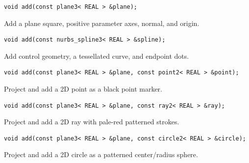 \par\noindent\begin{minipage}{\linewidth}
\begin{lstlisting}[style=apireference]
void add(const plane3< REAL > &plane);
\end{lstlisting}
{\footnotesize Add a plane square, positive parameter axes, normal, and origin.\par}
\end{minipage}\par\vspace{1pt}
\par\noindent\begin{minipage}{\linewidth}
\begin{lstlisting}[style=apireference]
void add(const nurbs_spline3< REAL > &spline);
\end{lstlisting}
{\footnotesize Add control geometry, a tessellated curve, and endpoint dots.\par}
\end{minipage}\par\vspace{1pt}
\par\noindent\begin{minipage}{\linewidth}
\begin{lstlisting}[style=apireference]
void add(const plane3< REAL > &plane, const point2< REAL > &point);
\end{lstlisting}
{\footnotesize Project and add a 2D point as a black point marker.\par}
\end{minipage}\par\vspace{1pt}
\par\noindent\begin{minipage}{\linewidth}
\begin{lstlisting}[style=apireference]
void add(const plane3< REAL > &plane, const ray2< REAL > &ray);
\end{lstlisting}
{\footnotesize Project and add a 2D ray with pale-red patterned strokes.\par}
\end{minipage}\par\vspace{1pt}
\par\noindent\begin{minipage}{\linewidth}
\begin{lstlisting}[style=apireference]
void add(const plane3< REAL > &plane, const circle2< REAL > &circle);
\end{lstlisting}
{\footnotesize Project and add a 2D circle as a patterned center/radius sphere.\par}
\end{minipage}\par\vspace{1pt}
